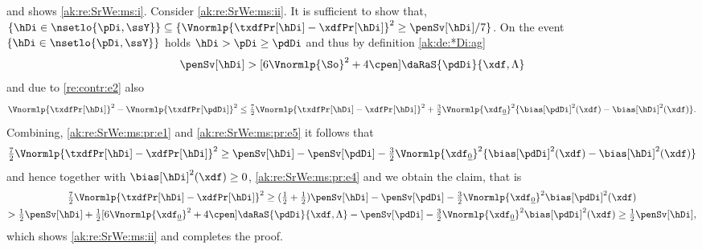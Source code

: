 \begin{pro}
  and shows \ref{ak:re:SrWe:ms:i}.  Consider \ref{ak:re:SrWe:ms:ii}. It is sufficient to show that,
  $\{\hDi\in\nsetlo{\pDi,\ssY}\}\subseteq
  \{\Vnormlp{\txdfPr[\hDi]-\xdfPr[\hDi]}^2\geq\penSv[\hDi]/7\}$.  On the
  event $\{\hDi\in\nsetlo{\pDi,\ssY}\}$ holds $\hDi>\pDi\geq\pdDi$ and
  thus by definition \eqref{ak:de:*Di:ag}
  \begin{equation}\label{ak:re:SrWe:ms:pr:e4}
    \penSv[\hDi] > [6\Vnormlp{\So}^2+ 4\cpen] \daRaS{\pdDi}{\xdf,\Lambda}
  \end{equation}
  and due to  \ref{re:contr:e2} also
  \begin{equation}\label{ak:re:SrWe:ms:pr:e5}
    \Vnormlp{\txdfPr[\hDi]}^2-\Vnormlp{\txdfPr[\pdDi]}^2\leq
    \tfrac{7}{2}\Vnormlp{\txdfPr[\hDi]-\xdfPr[\hDi]}^2+\tfrac{3}{2}\Vnormlp{\xdf_{\underline{0}}}^2
    \{\bias[\pdDi]^2(\xdf)-\bias[\hDi]^2(\xdf)\}.
  \end{equation}
  Combining, \eqref{ak:re:SrWe:ms:pr:e1} and \eqref{ak:re:SrWe:ms:pr:e5} it
  follows that
  \begin{multline*}
    \tfrac{7}{2}\Vnormlp{\txdfPr[\hDi]-\xdfPr[\hDi]}^2\geq
    \penSv[\hDi]-\penSv[\pdDi]  -\tfrac{3}{2}\Vnormlp{\xdf_{\underline{0}}}^2
    \{\bias[\pdDi]^2(\xdf)-\bias[\hDi]^2(\xdf)\}\hfill
  \end{multline*}
  and hence together with $\bias[\hDi]^2(\xdf)\geq0$,
  \eqref{ak:re:SrWe:ms:pr:e4} and  we obtain the claim,
  that is
  \begin{multline*}
    \tfrac{7}{2}\Vnormlp{\txdfPr[\hDi]-\xdfPr[\hDi]}^2\geq
    (\tfrac{1}{2}+\tfrac{1}{2})\penSv[\hDi]-\penSv[\pdDi]  -\tfrac{3}{2}\Vnormlp{\xdf_{\underline{0}}}^2
    \bias[\pdDi]^2(\xdf)\\
    >\tfrac{1}{2}\penSv[\hDi]+\tfrac{1}{2}[6\Vnormlp{\xdf_{\underline{0}}}^2+ 4\cpen]
    \daRaS{\pdDi}{\xdf,\Lambda}-\penSv[\pdDi]-\tfrac{3}{2}\Vnormlp{\xdf_{\underline{0}}}^2
    \bias[\pdDi]^2(\xdf)
    \geq\tfrac{1}{2}\penSv[\hDi],
  \end{multline*}
  which shows \ref{ak:re:SrWe:ms:ii} and completes the proof.\proEnd
\end{pro}



